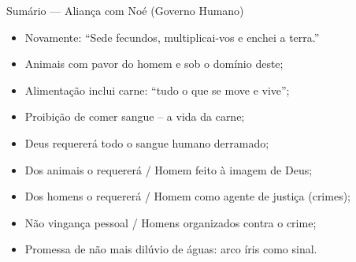 \documentclass[12pt,aspectratio=169]{beamer}
\newcommand{\RED}[1]{{\textcolor{TXred}{#1}}}
\newcommand{\ORA}[1]{{\textcolor{TXred!50!TXyel}{#1}}}
\newcommand{\YEL}[1]{{\textcolor{TXyel}{#1}}}
\newcommand{\GRE}[1]{{\textcolor{TXgre}{#1}}}
\newcommand{\CYA}[1]{{\textcolor{TXcya}{#1}}}
\newcommand{\BLU}[1]{{\textcolor{TXblu}{#1}}}
\newcommand{\MAG}[1]{{\textcolor{TXmag}{#1}}}
\begin{document}
    \begin{frame}
        \par\noindent\hspace*{0.05\linewidth}%
        \begin{minipage}{0.9\linewidth}%
            \large%
            \begin{alertblock}{Sumário --- Aliança com Noé (Governo Humano)}
                \normalsize
                \begin{itemize}
                    \item<1-> Novamente: ``Sede \YEL{fecundos}, \GRE{multiplicai-vos} e
                        \CYA{enchei} a \ORA{terra}.''
                    \item<1-> Animais com pavor do homem e sob o \YEL{domínio} deste;
                    \item<1-> Alimentação inclui \YEL{carne}: ``tudo o que se \YEL{move} e
                        \YEL{vive}'';
                    \item<1-> Proibição de comer \RED{sangue} -- a \YEL{vida} da carne;
                    \item<1-> Deus requererá todo o \RED{sangue} humano derramado;
                    \item<1-> Dos \YEL{animais} o requererá / \GRE{Homem} feito \CYA{à imagem de
                        Deus};
                    \item<1-> Dos \YEL{homens} o requererá / \GRE{Homem} como \YEL{agente de
                        justiça} (crimes);
                    \item<1-> Não \RED{vingança pessoal} / Homens \YEL{organizados} contra o
                        crime;
                    \item<1-> \RED{Promessa} \ORA{de não mais} \YEL{dilúvio} \GRE{de águas:}
                        \CYA{arco íris} \BLU{como} \MAG{sinal.}
                \end{itemize}
            \end{alertblock}
        \end{minipage}%
    \end{frame}

\end{document}
